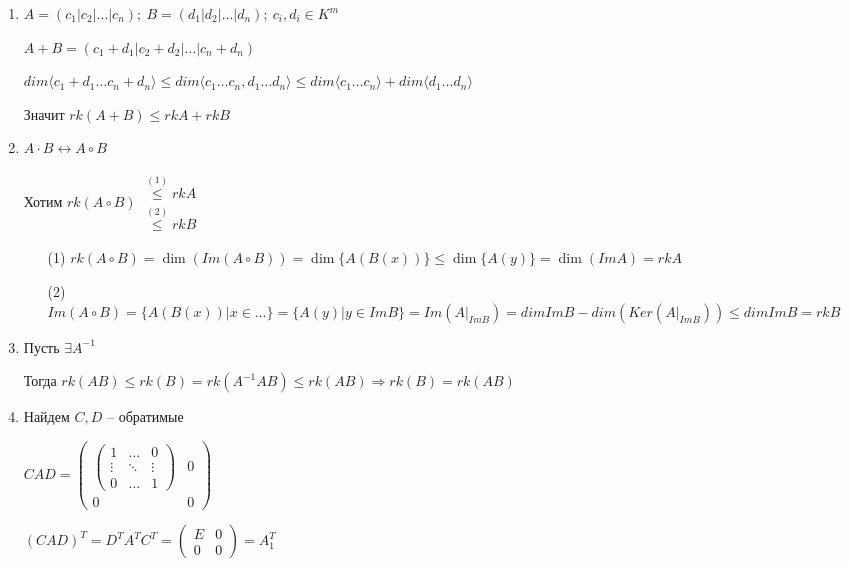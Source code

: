 \documentclass[12pt]{article}
\newcommand{\q}[1]{\langle #1 \rangle}
\begin{document}
\begin{enumerate}
    \item $A = (c_1 | c_2 | \ldots | c_n);\ B = (d_1 | d_2 | \ldots | d_n);\ c_i, d_i \in K^m$
    
    $A + B = (c_1 + d_1 | c_2 + d_2 | \ldots | c_n + d_n)$

    $dim\q{c_1 + d_1 \ldots c_n + d_n} \leq dim\q{c_1 \ldots c_n, d_1 \ldots d_n} \leq dim\q{c_1 \ldots c_n} + dim\q{d_1 \ldots d_n}$

    Значит $rk(A + B) \leq rkA + rkB$

    \item $A \cdot B \leftrightarrow A \circ B$
    
    Хотим $rk(A \circ B) \begin{gathered}
        \stackrel{(1)}{\leq} rkA \\
        \stackrel{(2)}{\leq} rkB
    \end{gathered}$

    \begin{itemize}
        \item[(1)] $rk(A \circ B) = \dim(Im(A \circ B)) = \dim\{A(B(x))\} \leq \dim\{A(y)\} = \dim(ImA) = rkA$
        \item[(2)] $Im(A \circ B) = \{A(B(x)) | x \in \ldots \} = \{ A(y) | y \in ImB \} = Im(A|_{ImB}) = dimImB - dim(Ker(A|_{ImB})) \leq dimImB = rkB$
    \end{itemize}

    \item Пусть $\exists A^{-1}$
    
    Тогда $rk(AB) \leq rk(B) = rk(A^{-1}AB) \leq rk(AB) \Rightarrow rk(B) = rk(AB)$

    \item Найдем $C, D$ -- обратимые
    
    $CAD = \begin{pmatrix}
        \begin{pmatrix}
            1 & \ldots & 0 \\
            \vdots & \ddots & \vdots \\
            0 & \ldots & 1
        \end{pmatrix} & 0 \\
        0 & 0
    \end{pmatrix}$

    $(CAD)^T = D^TA^TC^T = \begin{pmatrix}
        E & 0 \\
        0 & 0
    \end{pmatrix} = A_1^T$


\end{enumerate}
\end{document}
